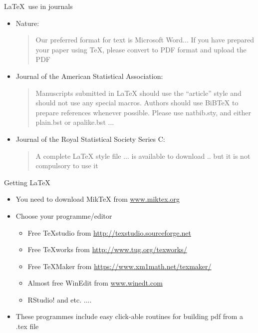 \documentclass{beamer}             %
\begin{document}
\begin{frame}{\LaTeX \ use in journals}
\begin{itemize}
\setlength{\itemsep}{.25cm}
\item Nature:
\begin{quote}
Our preferred format for text is Microsoft Word... If you have prepared your paper using TeX, please convert to PDF format and upload the PDF
\end{quote}
\item Journal of the American Statistical Association:
\begin{quote}
Manuscripts submitted in LaTeX should use the ``article'' style and should not use any special macros. Authors should use BiBTeX to prepare references whenever possible. Please use {natbib.sty}, and either {plain.bst} or {apalike.bst} ...
\end{quote}
\item Journal of the Royal Statistical Society Series C:
\begin{quote}
A complete LaTeX style file ... is available to download .. but it is not compulsory to use it
\end{quote}
\end{itemize}
\end{frame}


\begin{frame}{Getting \LaTeX}
\begin{itemize}
\setlength{\itemsep}{.5cm}
\item You need to download MikTeX from \url{www.miktex.org}
\item Choose your programme/editor
\begin{itemize}
 \item Free TeXstudio from \url{http://texstudio.sourceforge.net}
 \item Free TeXworks from \url{http://www.tug.org/texworks/} 
 \setlength{\itemsep}{.25cm}
 \item Free TeXMaker from \url{https://www.xm1math.net/texmaker/}
 \item Almost free WinEdit from \url{www.winedt.com}
 \item RStudio! and etc. ....
\end{itemize}
\item These programmes include easy click-able routines for building pdf from a .tex file
\end{itemize}
\end{frame}
\end{document}
